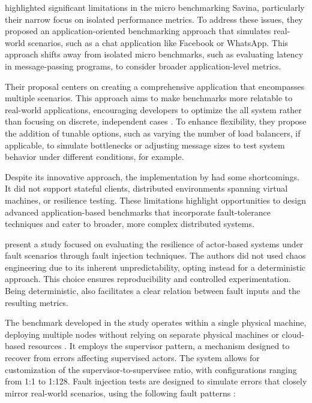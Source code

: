 \textcite{Blessing2019} highlighted significant limitations in the micro benchmarking Savina, particularly their narrow focus on isolated performance metrics. To address these issues, they proposed an application-oriented benchmarking approach that simulates real-world scenarios, such as a chat application like Facebook or WhatsApp. This approach shifts away from isolated micro benchmarks, such as evaluating latency in message-passing programs, to consider broader application-level metrics.

Their proposal centers on creating a comprehensive application that encompasses multiple scenarios. This approach aims to make benchmarks more relatable to real-world applications, encouraging developers to optimize the all system rather than focusing on discrete, independent cases \cite{Blessing2019}. To enhance flexibility, they propose the addition of tunable options, such as varying the number of load balancers, if applicable, to simulate bottlenecks or adjusting message sizes to test system behavior under different conditions, for example.

Despite its innovative approach, the implementation by \textcite{Blessing2019} had some shortcomings. It did not support stateful clients, distributed environments spanning virtual machines, or resilience testing. These limitations highlight opportunities to design advanced application-based benchmarks that incorporate fault-tolerance techniques and cater to broader, more complex distributed systems.

\textcite{Randtoul2022} present a study focused on evaluating the resilience of actor-based systems under fault scenarios through fault injection techniques. The authors did not used chaos engineering due to its inherent unpredictability, opting instead for a deterministic approach. This choice ensures reproducibility and controlled experimentation. Being deterministic, also facilitates a clear relation between fault inputs and the resulting metrics.

The benchmark developed in the study operates within a single physical machine, deploying multiple nodes without relying on separate physical machines or cloud-based resources \cite{Randtoul2022}. It employs the supervisor pattern, a mechanism designed to recover from errors affecting supervised actors. The system allows for customization of the supervisor-to-supervisee ratio, with configurations ranging from 1:1 to 1:128. Fault injection tests are designed to simulate errors that closely mirror real-world scenarios, using the following fault patterns \cite{Randtoul2022}:

